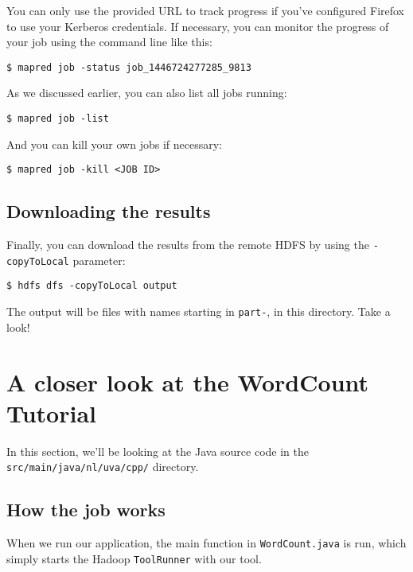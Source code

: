 \documentclass[a4paper,11pt]{article}
\begin{document}
You can only use the provided URL to track progress if you've configured Firefox to use your Kerberos credentials.
If necessary, you can monitor the progress of your job using the command line like this:

\begin{lstlisting}
$ mapred job -status job_1446724277285_9813
\end{lstlisting}

As we discussed earlier, you can also list all jobs running:

\begin{lstlisting}
$ mapred job -list
\end{lstlisting}

And you can kill your own jobs if necessary:

\begin{lstlisting}
$ mapred job -kill <JOB ID>
\end{lstlisting}


  \subsection{Downloading the results}

  Finally, you can download the results from the remote HDFS by using the \texttt{-copyToLocal} parameter:

\begin{lstlisting}
$ hdfs dfs -copyToLocal output
\end{lstlisting}

The output will be files with names starting in \texttt{part-}, in this directory. Take a look!
  
  \section{A closer look at the WordCount Tutorial}
  
  In this section, we'll be looking at the Java source code in the \texttt{src/main/java/nl/uva/cpp/} directory.

  \subsection{How the job works}

  When we run our application, the main function in \texttt{WordCount.java} is run, which simply starts the Hadoop
  \texttt{ToolRunner} with our tool.
\end{document}
